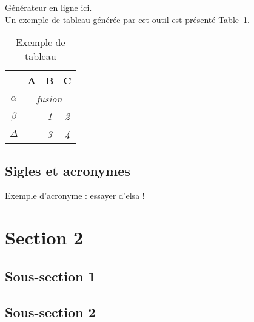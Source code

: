 Générateur en ligne \href{http://www.tablesgenerator.com/latex_tables}{ici}. \\

Un exemple de tableau générée par cet outil est présenté Table~\ref{tableau_exemple}.

\begin{table}[]
\centering
\begin{tabular}{c|c|c|c|}
\cline{2-4}
                               & \textbf{A}                 & \textbf{B} & \textbf{C} \\ \hline
\multicolumn{1}{|c|}{$\alpha$} & \multicolumn{3}{c|}{\textit{fusion}}                 \\ \hline
\multicolumn{1}{|c|}{$\beta$}  & \multirow{2}{*}{\textit{}} & \textit{1} & \textit{2} \\ \cline{1-1} \cline{3-4} 
\multicolumn{1}{|c|}{$\Delta$} &                            & \textit{3} & \textit{4} \\ \hline
\end{tabular}
\caption{Exemple de tableau}
\label{tableau_exemple}
\end{table}


\FloatBarrier
\subsection{Sigles et acronymes}

Exemple d'acronyme : essayer d'\ac{elsa} !

\FloatBarrier
\section{Section 2}
\subsection{Sous-section 1}
\blindtext

\subsection{Sous-section 2}
\blindtext

